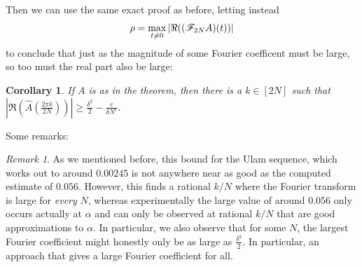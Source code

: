 \documentclass{report}
\newtheorem{corollary}{Corollary}[theorem]
\theoremstyle{remark}
\newtheorem{remark}{Remark}
\numberwithin{equation}{section}
\begin{document}
Then we can use the same exact proof as before, letting instead
\[\rho = \max_{t \neq 0} |\Re((\mathscr{F}_{2N}A)(t))|\] to conclude that
just as the magnitude of some Fourier coefficent must be large, so too
must the real part also be large:

\begin{corollary}\label{thm:alpha_real}
  If $A$ is as in the theorem, then there is a $k \in [2N]$ such that
  $|\Re(\widehat{A}(\frac{2\pi k}{2N}))| \geq \frac{\delta^2}{2} -
  \frac{c}{\delta N^\epsilon}$.
\end{corollary}

Some remarks: 

\begin{remark}
  As we mentioned before, this bound for the Ulam sequence, which
  works out to around $0.00245$ is not anywhere near as good as the
  computed estimate of $0.056$.  However, this finds a rational $k/N$
  where the Fourier transform is large for \textit{every} $N$, whereas
  experimentally the large value of around $0.056$ only occurs
  actually at $\alpha$ and can only be observed at rational $k/N$ that
  are good approximations to $\alpha$.  In particular, we also observe
  that for some $N$, the largest Fourier coefficient might honestly
  only be as large as $\frac{\delta^2}{2}$.  In particular, an
  approach that gives a large Fourier coefficient for all.
\end{remark}

\end{document}
